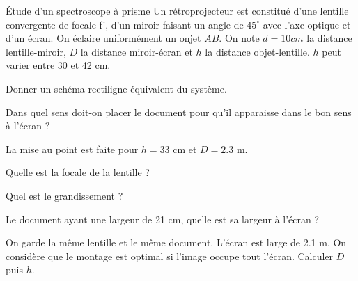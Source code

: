 \begin{exo}[PCSI][1][colle]{Étude d'un spectroscope à prisme}
Un rétroprojecteur est constitué d'une lentille convergente de focale f', d'un miroir faisant un angle de $45^{\circ}$ avec l'axe optique et d'un écran. On éclaire uniformément
un onjet $AB$. On note $d=10cm$ la distance lentille-miroir, $D$ la distance miroir-écran et $h$ la distance objet-lentille. $h$ peut varier entre 30 et 42 cm.

\begin{quest}
 \item Donner un schéma rectiligne équivalent du système.
 \item Dans quel sens doit-on placer le document pour qu'il apparaisse dans le bon sens à l'écran ?
 \item La mise au point est faite pour $h=33$ cm et $D=2.3$ m.
 \begin{quest}
  \item Quelle est la focale de la lentille ?
  \item Quel est le grandissement ?
  \item Le document ayant une largeur de 21 cm, quelle est sa largeur à l'écran ?
 \end{quest}
 \item On garde la même lentille et le même document. L'écran est large de 2.1 m. On considère que le montage est optimal si l'image occupe tout l'écran. Calculer $D$ puis $h$.
\end{quest}
\end{exo}




